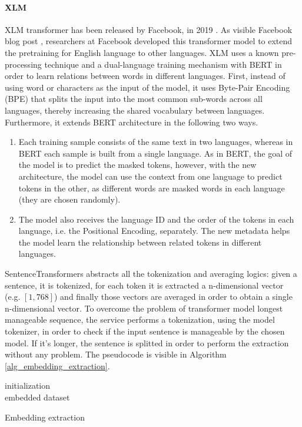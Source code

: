 \documentclass[\main/main.tex]{subfiles}
\begin{document}
\paragraph{XLM}
XLM transformer has been released by Facebook, in 2019 \cite{DBLP:journals/corr/abs-1901-07291}. As visible Facebook blog post \cite{xlm_blog_post}, researchers at Facebook developed this transformer model to extend the pretraining for English language to other languages. XLM uses a known pre-processing technique and a dual-language training mechanism with BERT in order to learn relations between words in different languages. First, instead of using word or characters as the input of the model, it uses Byte-Pair Encoding (BPE) that splits the input into the most common sub-words across all languages, thereby increasing the shared vocabulary between languages. Furthermore, it extends BERT architecture in the following two ways.
\begin{enumerate}
    \item Each training sample consists of the same text in two languages, whereas in BERT each sample is built from a single language. As in BERT, the goal of the model is to predict the masked tokens, however, with the new architecture, the model can use the context from one language to predict tokens in the other, as different words are masked words in each language (they are chosen randomly).
    \item The model also receives the language ID and the order of the tokens in each language, i.e. the Positional Encoding, separately. The new metadata helps the model learn the relationship between related tokens in different languages.
\end{enumerate}


SentenceTransformers abstracts all the tokenization and averaging logics: given a sentence, it is tokenized, for each token it is extracted a n-dimensional vector (e.g. $[1, 768]$) and finally those vectors are averaged in order to obtain a single n-dimensional vector. To overcome the problem of transformer model longest manageable sequence, the service performs a tokenization, using the model tokenizer, in order to check if the input sentence is manageable by the chosen model. If it's longer, the sentence is splitted in order to perform the extraction without any problem. The pseudocode is visible in Algorithm \ref{alg_embedding_extraction}.
\begin{center}
    \begin{algorithm}[H]
     initialization \\
     \Return embedded dataset
     \caption{Embedding extraction}
     \label{alg_embedding_extraction}
    \end{algorithm}
\end{center}
\end{document}
